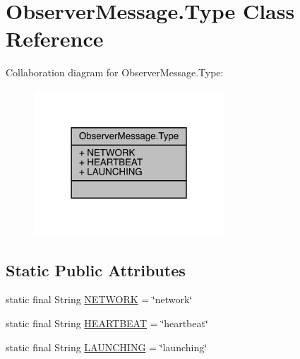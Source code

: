\hypertarget{classcom_1_1toast_1_1android_1_1gamebase_1_1observer_1_1_observer_message_1_1_type}{}\section{Observer\+Message.\+Type Class Reference}
\label{classcom_1_1toast_1_1android_1_1gamebase_1_1observer_1_1_observer_message_1_1_type}


Collaboration diagram for Observer\+Message.\+Type\+:
\nopagebreak
\begin{figure}[H]
\begin{center}
\leavevmode
\includegraphics[width=202pt]{classcom_1_1toast_1_1android_1_1gamebase_1_1observer_1_1_observer_message_1_1_type__coll__graph}
\end{center}
\end{figure}
\subsection*{Static Public Attributes}
\begin{DoxyCompactItemize}
\item 
static final String \hyperlink{classcom_1_1toast_1_1android_1_1gamebase_1_1observer_1_1_observer_message_1_1_type_ae6d1c11b75276494cf927452ed336391}{N\+E\+T\+W\+O\+RK} = \char`\"{}network\char`\"{}
\item 
static final String \hyperlink{classcom_1_1toast_1_1android_1_1gamebase_1_1observer_1_1_observer_message_1_1_type_ab90b8bd7cb0839397fc197f9cbf8b104}{H\+E\+A\+R\+T\+B\+E\+AT} = \char`\"{}heartbeat\char`\"{}
\item 
static final String \hyperlink{classcom_1_1toast_1_1android_1_1gamebase_1_1observer_1_1_observer_message_1_1_type_a4ff7787a7bdc686350e4faf2809b9cac}{L\+A\+U\+N\+C\+H\+I\+NG} = \char`\"{}launching\char`\"{}
\end{DoxyCompactItemize}


